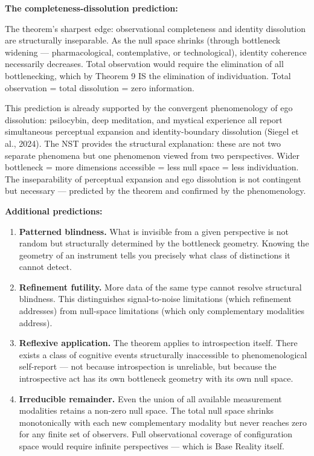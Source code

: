 \textbf{The completeness-dissolution prediction:}


The theorem's sharpest edge: observational completeness and identity dissolution are structurally inseparable. As the null space shrinks (through bottleneck widening — pharmacological, contemplative, or technological), identity coherence necessarily decreases. Total observation would require the elimination of all bottlenecking, which by Theorem 9 IS the elimination of individuation. Total observation = total dissolution = zero information.


This prediction is already supported by the convergent phenomenology of ego dissolution: psilocybin, deep meditation, and mystical experience all report simultaneous perceptual expansion and identity-boundary dissolution (Siegel et al., 2024). The NST provides the structural explanation: these are not two separate phenomena but one phenomenon viewed from two perspectives. Wider bottleneck = more dimensions accessible = less null space = less individuation. The inseparability of perceptual expansion and ego dissolution is not contingent but necessary — predicted by the theorem and confirmed by the phenomenology.


\textbf{Additional predictions:}


\begin{enumerate}[nosep,leftmargin=*]
  \item \textbf{Patterned blindness.} What is invisible from a given perspective is not random but structurally determined by the bottleneck geometry. Knowing the geometry of an instrument tells you precisely what class of distinctions it cannot detect.
  \item \textbf{Refinement futility.} More data of the same type cannot resolve structural blindness. This distinguishes signal-to-noise limitations (which refinement addresses) from null-space limitations (which only complementary modalities address).
  \item \textbf{Reflexive application.} The theorem applies to introspection itself. There exists a class of cognitive events structurally inaccessible to phenomenological self-report — not because introspection is unreliable, but because the introspective act has its own bottleneck geometry with its own null space.
  \item \textbf{Irreducible remainder.} Even the union of all available measurement modalities retains a non-zero null space. The total null space shrinks monotonically with each new complementary modality but never reaches zero for any finite set of observers. Full observational coverage of configuration space would require infinite perspectives — which is Base Reality itself.
\end{enumerate}


